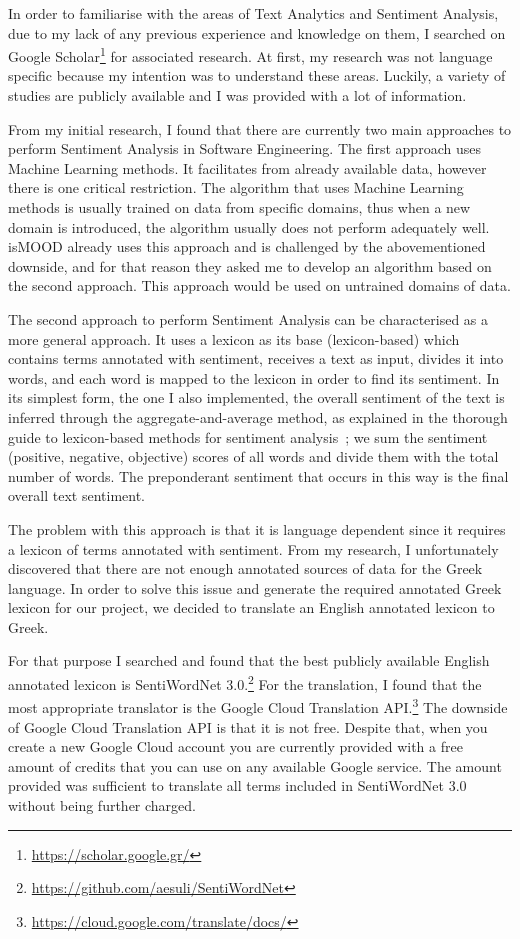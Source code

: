 In order to familiarise with the areas
of Text Analytics and Sentiment Analysis,
due to my lack of any previous experience and knowledge on them,
I searched on Google Scholar\footnote{\url {https://scholar.google.gr/}}
for associated research.
At first, my research was not language specific
because my intention was to understand these areas.
Luckily, a variety of studies are publicly available
and I was provided with a lot of information.

From my initial research, I found that 
there are currently two main approaches
to perform Sentiment Analysis in Software Engineering.
The first approach uses Machine Learning methods.
It facilitates from already available data,
however there is one critical restriction.
The algorithm that uses Machine Learning methods
is usually trained on data from specific domains,
thus when a new domain is introduced,
the algorithm usually does not perform adequately well.
isMOOD already uses this approach
and is challenged by the abovementioned downside,
and for that reason they asked me to develop
an algorithm based on the second approach.
This approach would be used on untrained domains of data.

The second approach to perform Sentiment Analysis
can be characterised as a more general approach.
It uses a lexicon as its base (lexicon-based)
which contains terms annotated with sentiment,
receives a text as input, divides it into words,
and each word is mapped to the lexicon
in order to find its sentiment.
In its simplest form, the one I also implemented,
the overall sentiment of the text is inferred
through the aggregate-and-average method,
as explained in the thorough guide
to lexicon-based methods for sentiment analysis~\cite{TBTV11};
we sum the sentiment (positive, negative, objective) scores
of all words and divide them with the total number of words.
The preponderant sentiment that occurs in this way
is the final overall text sentiment.

The problem with this approach is that it is language dependent
since it requires a lexicon of terms annotated with sentiment.
From my research, I unfortunately discovered that there are
not enough annotated sources of data for the Greek language.
In order to solve this issue
and generate the required annotated Greek lexicon for our project,
we decided to translate an English annotated lexicon to Greek.

For that purpose I searched and found
that the best publicly available English annotated lexicon
is SentiWordNet 3.0.\footnote{\url {https://github.com/aesuli/SentiWordNet}}
For the translation, I found that the most appropriate translator
is the Google Cloud Translation API.\footnote{\url {https://cloud.google.com/translate/docs/}}
The downside of Google Cloud Translation API is
that it is not free.
Despite that, when you create a new Google Cloud account
you are currently provided with a free amount of credits
that you can use on any available Google service.
The amount provided was sufficient to translate all terms
included in SentiWordNet 3.0 without being further charged.

